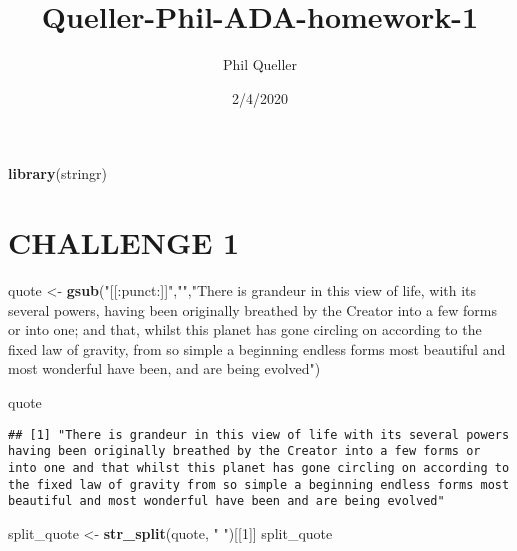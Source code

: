 \documentclass[]{article}
\title{Queller-Phil-ADA-homework-1}
\author{Phil Queller}
\date{2/4/2020}
\newenvironment{Shaded}{\begin{snugshade}}{\end{snugshade}}
\newcommand{\KeywordTok}[1]{\textcolor[rgb]{0.13,0.29,0.53}{\textbf{#1}}}
\newcommand{\DecValTok}[1]{\textcolor[rgb]{0.00,0.00,0.81}{#1}}
\newcommand{\StringTok}[1]{\textcolor[rgb]{0.31,0.60,0.02}{#1}}
\newcommand{\NormalTok}[1]{#1}
\begin{document}
\maketitle

\begin{Shaded}
\begin{Highlighting}[]
\KeywordTok{library}\NormalTok{(stringr)}
\end{Highlighting}
\end{Shaded}

\section{CHALLENGE 1}\label{challenge-1}

\begin{Shaded}
\begin{Highlighting}[]
\NormalTok{quote <-}\StringTok{ }\KeywordTok{gsub}\NormalTok{(}\StringTok{"[[:punct:]]"}\NormalTok{,}\StringTok{""}\NormalTok{,}\StringTok{"There is grandeur in this view of life, with its several powers, having been originally breathed by the Creator into a few forms or into one; and that, whilst this planet has gone circling on according to the fixed law of gravity, from so simple a beginning endless forms most beautiful and most wonderful have been, and are being evolved"}\NormalTok{)}

\NormalTok{quote}
\end{Highlighting}
\end{Shaded}

\begin{verbatim}
## [1] "There is grandeur in this view of life with its several powers having been originally breathed by the Creator into a few forms or into one and that whilst this planet has gone circling on according to the fixed law of gravity from so simple a beginning endless forms most beautiful and most wonderful have been and are being evolved"
\end{verbatim}

\begin{Shaded}
\begin{Highlighting}[]
\NormalTok{split_quote <-}\StringTok{ }\KeywordTok{str_split}\NormalTok{(quote, }\StringTok{" "}\NormalTok{)[[}\DecValTok{1}\NormalTok{]]}
\NormalTok{split_quote}
\end{Highlighting}
\end{Shaded}
\end{document}
